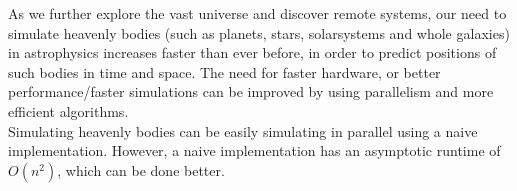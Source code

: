 As we further explore the vast universe and discover remote systems, our need to
simulate heavenly bodies (such as planets, stars, solarsystems and whole
galaxies) in astrophysics increases faster than ever before, in order to predict
positions of such bodies in time and space. The need for faster hardware, or
better performance/faster simulations can be improved by using parallelism and
more efficient algorithms.\\
Simulating heavenly bodies can be easily simulating in parallel using a naive
implementation. However, a naive implementation has an asymptotic runtime of
$O(n^2)$, which can be done better.\\
